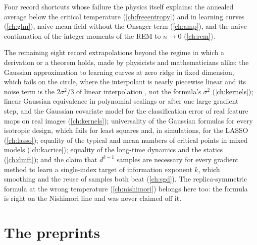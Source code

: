 \begin{refsection}
Four record shortcuts whose failure the physics itself explains: the annealed average below the critical temperature (\cref{ch:freeentropy}) and in learning curves (\cref{ch:glm}), naive mean field without the Onsager term (\cref{ch:amp}), and the naive continuation of the integer moments of the REM to $n\to0$ (\cref{ch:rem}).

The remaining eight record extrapolations beyond the regime in which a derivation or a theorem holds, made by physicists and mathematicians alike: the Gaussian approximation to learning curves at zero ridge in fixed dimension, which fails on the circle, where the interpolant is nearly piecewise linear and its noise term is the $2\sigma^2/3$ of linear interpolation \parencite{BelkinEtAl2018}, not the formula's $\sigma^2$ (\cref{ch:kernels}); linear Gaussian equivalence in polynomial scalings or after one large gradient step, and the Gaussian covariate model for the classification error of real feature maps on real images (\cref{ch:kernels}); universality of the Gaussian formulas for every isotropic design, which fails for least squares and, in simulations, for the LASSO (\cref{ch:lasso}); equality of the typical and mean numbers of critical points in mixed models (\cref{ch:kacrice}); equality of the long-time dynamics and the statics (\cref{ch:dmft}); and the claim that $d^{k-1}$ samples are necessary for every gradient method to learn a single-index target of information exponent $k$, which smoothing and the reuse of samples both beat (\cref{ch:sgd}). The replica-symmetric formula at the wrong temperature (\cref{ch:nishimori}) belongs here too: the formula is right on the Nishimori line and was never claimed off it.

\section*{The preprints}


\end{refsection}
